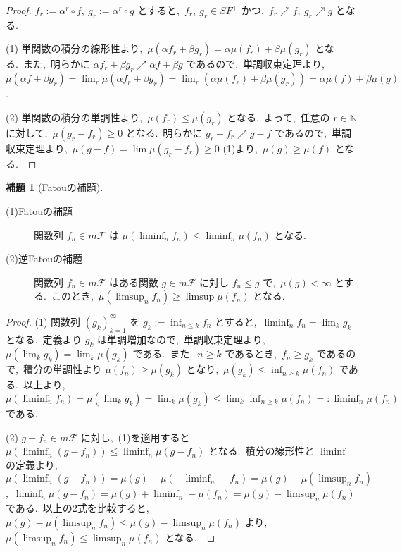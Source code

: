 \documentclass[a4j,11pt]{jarticle}
\theoremstyle{definition}
\newtheorem{lemma}[theorem]{補題}
\begin{document}
\begin{proof}
  $f_r := \alpha^r \circ f,\ g_r := \alpha^r \circ g$
  とすると,\ 
  $f_r,\ g_r \in SF^+$
  かつ,\ 
  $f_r \nearrow f,\ g_r \nearrow g$
  となる.\ 
  
  (1)
  単関数の積分の線形性より,\ 
  $\mu(\alpha f_r + \beta g_r) = \alpha \mu(f_r) + \beta \mu(g_r)$
  となる.\ 
  また,\ 明らかに
  $\alpha f_r + \beta g_r \nearrow \alpha f + \beta g$
  であるので,\ 単調収束定理より,\ 
  $\mu(\alpha f + \beta g_r) = \lim_r \mu(\alpha f_r + \beta g_r) = \lim_r \left(  \alpha \mu(f_r) + \beta \mu(g_r) \right) = \alpha \mu(f) + \beta \mu(g)$.

  (2)
  単関数の積分の単調性より,\ 
  $\mu(f_r) \leq \mu(g_r)$
  となる.\ 
  よって,\ 任意の
  $r \in \mathbb{N}$
  に対して,\ 
  $\mu(g_r - f_r) \geq 0$
  となる.\ 
  明らかに
  $g_r-f_r \nearrow g-f$
  であるので,\ 単調収束定理より,\ 
  $\mu(g-f) = \lim \mu(g_r - f_r) \geq 0$
  (1)より,\ 
  $\mu(g) \geq \mu(f)$
  となる.\ 
\end{proof}


\begin{lemma}[Fatouの補題]\label{lemma:Fatou}
  \mbox{}
  \begin{description}
    \item[(1)Fatouの補題]
      関数列
      $f_n \in m\mathcal{F}$
      は
      $\mu\left( \liminf_n f_n\right) \leq \liminf_n \mu(f_n)$
      となる.\ 
    \item[(2)逆Fatouの補題]
      関数列
      $f_n \in m\mathcal{F}$
      はある関数
      $g \in m\mathcal{F}$
      に対し
      $f_n \leq g$
      で,\ 
      $\mu(g) < \infty$
      とする.\ 
      このとき,\ 
      $\mu\left( \limsup_n f_n\right) \geq \limsup \mu(f_n)$
      となる.\ 
  \end{description}
\end{lemma}

\begin{proof}
  (1)
  関数列
  $(g_k)_{k=1}^{\infty}$
  を
  $g_k:= \inf_{n\leq k} f_n$
  とすると,\ 
  $\liminf_n f_n = \lim_k g_k$
  となる.\ 
  定義より
  $g_k$
  は単調増加なので,\ 単調収束定理より,\ 
  $\mu\left( \lim_k g_k\right) = \lim_k \mu(g_k)$
  である.\ 
  また,\ 
  $n \geq k$
  であるとき,\ 
  $f_n \geq g_k$
  であるので,\ 積分の単調性より
  $\mu(f_n) \geq \mu(g_k)$
  となり,\ 
  $\mu(g_k) \leq \inf_{n\geq k} \mu(f_n)$
  である.\ 
  以上より,\ 
  $\mu\left( \liminf_n f_n\right) = \mu\left( \lim_k g_k\right) = \lim_k \mu(g_k) \leq \lim_k \inf_{n\geq k} \mu(f_n) =: \liminf_n \mu(f_n)$
  である.\ 

  (2)
  $g-f_n \in m\mathcal{F}$
  に対し,\ (1)を適用すると
  $\mu\left( \liminf_n (g-f_n)\right) \leq \liminf_n \mu(g-f_n)$
  となる.\ 
  積分の線形性と
  $\liminf$
  の定義より,\ 
  $\mu\left( \liminf_n (g-f_n)\right) = \mu(g) - \mu\left( -\liminf_n -f_n\right) = \mu(g) - \mu\left( \limsup_n f_n\right)$,\ 
  $\liminf_n \mu(g-f_n) = \mu(g) + \liminf_n - \mu(f_n) = \mu(g) - \limsup_n \mu(f_n)$
  である.\ 
  以上の2式を比較すると,\ 
  $\mu(g) - \mu\left( \limsup_n f_n\right) \leq \mu(g) - \limsup_n \mu(f_n)$
  より,\ 
  $\mu\left( \limsup_n f_n\right) \leq \limsup_n \mu(f_n)$
  となる.\ 
\end{proof}
\end{document}
